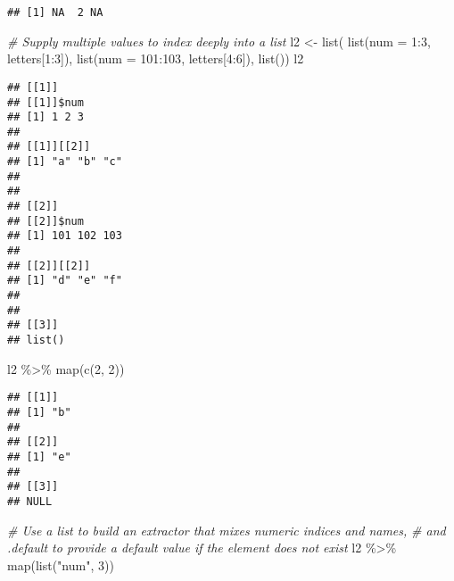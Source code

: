 \documentclass[
]{book}
\newenvironment{Shaded}{\begin{snugshade}}{\end{snugshade}}
\newcommand{\AttributeTok}[1]{\textcolor[rgb]{0.77,0.63,0.00}{#1}}
\newcommand{\CommentTok}[1]{\textcolor[rgb]{0.56,0.35,0.01}{\textit{#1}}}
\newcommand{\DecValTok}[1]{\textcolor[rgb]{0.00,0.00,0.81}{#1}}
\newcommand{\FunctionTok}[1]{\textcolor[rgb]{0.00,0.00,0.00}{#1}}
\newcommand{\NormalTok}[1]{#1}
\newcommand{\OtherTok}[1]{\textcolor[rgb]{0.56,0.35,0.01}{#1}}
\newcommand{\SpecialCharTok}[1]{\textcolor[rgb]{0.00,0.00,0.00}{#1}}
\newcommand{\StringTok}[1]{\textcolor[rgb]{0.31,0.60,0.02}{#1}}
\begin{document}
\begin{verbatim}
## [1] NA  2 NA
\end{verbatim}

\begin{Shaded}
\begin{Highlighting}[]
\CommentTok{\# Supply multiple values to index deeply into a list}
\NormalTok{l2 }\OtherTok{\textless{}{-}} \FunctionTok{list}\NormalTok{(}
  \FunctionTok{list}\NormalTok{(}\AttributeTok{num =} \DecValTok{1}\SpecialCharTok{:}\DecValTok{3}\NormalTok{,     letters[}\DecValTok{1}\SpecialCharTok{:}\DecValTok{3}\NormalTok{]),}
  \FunctionTok{list}\NormalTok{(}\AttributeTok{num =} \DecValTok{101}\SpecialCharTok{:}\DecValTok{103}\NormalTok{, letters[}\DecValTok{4}\SpecialCharTok{:}\DecValTok{6}\NormalTok{]),}
  \FunctionTok{list}\NormalTok{())}
\NormalTok{l2}
\end{Highlighting}
\end{Shaded}

\begin{verbatim}
## [[1]]
## [[1]]$num
## [1] 1 2 3
## 
## [[1]][[2]]
## [1] "a" "b" "c"
## 
## 
## [[2]]
## [[2]]$num
## [1] 101 102 103
## 
## [[2]][[2]]
## [1] "d" "e" "f"
## 
## 
## [[3]]
## list()
\end{verbatim}

\begin{Shaded}
\begin{Highlighting}[]
\NormalTok{l2 }\SpecialCharTok{\%\textgreater{}\%} 
  \FunctionTok{map}\NormalTok{(}\FunctionTok{c}\NormalTok{(}\DecValTok{2}\NormalTok{, }\DecValTok{2}\NormalTok{))}
\end{Highlighting}
\end{Shaded}

\begin{verbatim}
## [[1]]
## [1] "b"
## 
## [[2]]
## [1] "e"
## 
## [[3]]
## NULL
\end{verbatim}

\begin{Shaded}
\begin{Highlighting}[]
\CommentTok{\# Use a list to build an extractor that mixes numeric indices and names,}
\CommentTok{\# and .default to provide a default value if the element does not exist}
\NormalTok{l2 }\SpecialCharTok{\%\textgreater{}\%} 
  \FunctionTok{map}\NormalTok{(}\FunctionTok{list}\NormalTok{(}\StringTok{"num"}\NormalTok{, }\DecValTok{3}\NormalTok{))}
\end{Highlighting}
\end{Shaded}
\end{document}

